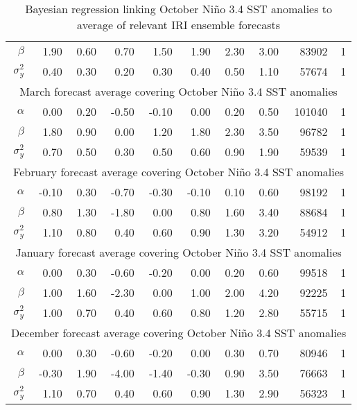 \begin{table*}[ht]
\begin{tabular}{rrrrrrrrrr}
  $\beta$ & 1.90 & 0.60 & 0.70 & 1.50 & 1.90 & 2.30 & 3.00 & 83902 &   1 \\ 
  $\sigma^{2}_{y}$ & 0.40 & 0.30 & 0.20 & 0.30 & 0.40 & 0.50 & 1.10 & 57674 &   1 \\ 
   \hline
\hline
\multicolumn{10}{c}{March forecast average covering October Ni\~no 3.4 SST anomalies}\\
  \hline
$\alpha$ & 0.00 & 0.20 & -0.50 & -0.10 & 0.00 & 0.20 & 0.50 & 101040 &   1 \\ 
  $\beta$ & 1.80 & 0.90 & 0.00 & 1.20 & 1.80 & 2.30 & 3.50 & 96782 &   1 \\ 
  $\sigma^{2}_{y}$ & 0.70 & 0.50 & 0.30 & 0.50 & 0.60 & 0.90 & 1.90 & 59539 &   1 \\ 
   \hline
\hline
\multicolumn{10}{c}{February forecast average covering October Ni\~no 3.4 SST anomalies}\\
  \hline
$\alpha$ & -0.10 & 0.30 & -0.70 & -0.30 & -0.10 & 0.10 & 0.60 & 98192 &   1 \\ 
  $\beta$ & 0.80 & 1.30 & -1.80 & 0.00 & 0.80 & 1.60 & 3.40 & 88684 &   1 \\ 
  $\sigma^{2}_{y}$ & 1.10 & 0.80 & 0.40 & 0.60 & 0.90 & 1.30 & 3.20 & 54912 &   1 \\ 
   \hline
\hline
\multicolumn{10}{c}{January forecast average covering October Ni\~no 3.4 SST anomalies}\\
  \hline
$\alpha$ & 0.00 & 0.30 & -0.60 & -0.20 & 0.00 & 0.20 & 0.60 & 99518 &   1 \\ 
  $\beta$ & 1.00 & 1.60 & -2.30 & 0.00 & 1.00 & 2.00 & 4.20 & 92225 &   1 \\ 
  $\sigma^{2}_{y}$ & 1.00 & 0.70 & 0.40 & 0.60 & 0.80 & 1.20 & 2.80 & 55715 &   1 \\ 
   \hline
\hline
\multicolumn{10}{c}{December forecast average covering October Ni\~no 3.4 SST anomalies}\\
  \hline
$\alpha$ & 0.00 & 0.30 & -0.60 & -0.20 & 0.00 & 0.30 & 0.70 & 80946 &   1 \\ 
  $\beta$ & -0.30 & 1.90 & -4.00 & -1.40 & -0.30 & 0.90 & 3.50 & 76663 &   1 \\ 
  $\sigma^{2}_{y}$ & 1.10 & 0.70 & 0.40 & 0.60 & 0.90 & 1.30 & 2.90 & 56323 &   1 \\ 
   \hline
\end{tabular}
\caption[Bayesian regression linking October Ni\~no 3.4 SST anomalies to average of relevant IRI ensemble forecasts]{Bayesian regression linking October Ni\~no 3.4 SST anomalies to average of relevant IRI ensemble forecasts} 
\end{table*}
